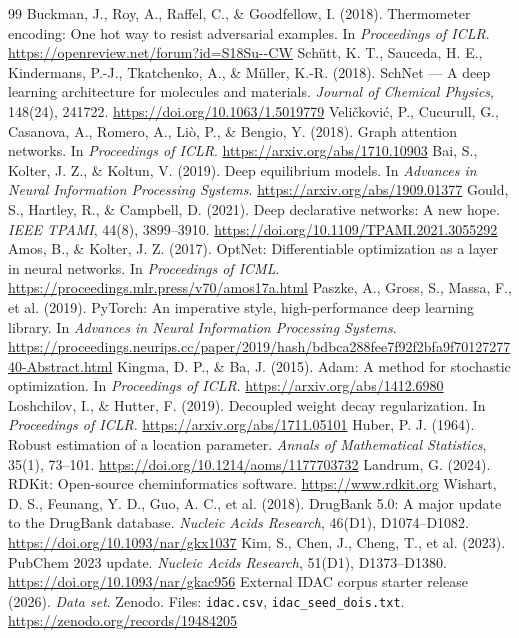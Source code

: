 \documentclass[11pt]{article}
\begin{document}
\begin{thebibliography}{99}
   Buckman, J., Roy, A., Raffel, C., \& Goodfellow, I. (2018). Thermometer encoding: One hot way to resist adversarial examples. In \textit{Proceedings of ICLR}. \url{https://openreview.net/forum?id=S18Su--CW}
   Schütt, K. T., Sauceda, H. E., Kindermans, P.-J., Tkatchenko, A., \& Müller, K.-R. (2018). SchNet --- A deep learning architecture for molecules and materials. \textit{Journal of Chemical Physics}, 148(24), 241722. \url{https://doi.org/10.1063/1.5019779}
   Veličković, P., Cucurull, G., Casanova, A., Romero, A., Liò, P., \& Bengio, Y. (2018). Graph attention networks. In \textit{Proceedings of ICLR}. \url{https://arxiv.org/abs/1710.10903}
   Bai, S., Kolter, J. Z., \& Koltun, V. (2019). Deep equilibrium models. In \textit{Advances in Neural Information Processing Systems}. \url{https://arxiv.org/abs/1909.01377}
   Gould, S., Hartley, R., \& Campbell, D. (2021). Deep declarative networks: A new hope. \textit{IEEE TPAMI}, 44(8), 3899--3910. \url{https://doi.org/10.1109/TPAMI.2021.3055292}
   Amos, B., \& Kolter, J. Z. (2017). OptNet: Differentiable optimization as a layer in neural networks. In \textit{Proceedings of ICML}. \url{https://proceedings.mlr.press/v70/amos17a.html}
   Paszke, A., Gross, S., Massa, F., et al. (2019). PyTorch: An imperative style, high-performance deep learning library. In \textit{Advances in Neural Information Processing Systems}. \url{https://proceedings.neurips.cc/paper/2019/hash/bdbca288fee7f92f2bfa9f7012727740-Abstract.html}
   Kingma, D. P., \& Ba, J. (2015). Adam: A method for stochastic optimization. In \textit{Proceedings of ICLR}. \url{https://arxiv.org/abs/1412.6980}
   Loshchilov, I., \& Hutter, F. (2019). Decoupled weight decay regularization. In \textit{Proceedings of ICLR}. \url{https://arxiv.org/abs/1711.05101}
   Huber, P. J. (1964). Robust estimation of a location parameter. \textit{Annals of Mathematical Statistics}, 35(1), 73--101. \url{https://doi.org/10.1214/aoms/1177703732}
   Landrum, G. (2024). RDKit: Open-source cheminformatics software. \url{https://www.rdkit.org}
   Wishart, D. S., Feunang, Y. D., Guo, A. C., et al. (2018). DrugBank 5.0: A major update to the DrugBank database. \textit{Nucleic Acids Research}, 46(D1), D1074--D1082. \url{https://doi.org/10.1093/nar/gkx1037}
   Kim, S., Chen, J., Cheng, T., et al. (2023). PubChem 2023 update. \textit{Nucleic Acids Research}, 51(D1), D1373--D1380. \url{https://doi.org/10.1093/nar/gkac956}
   External IDAC corpus starter release (2026). \textit{Data set}. Zenodo. Files: \texttt{idac.csv}, \texttt{idac\_seed\_dois.txt}. \url{https://zenodo.org/records/19484205}


\end{thebibliography}
\end{document}
